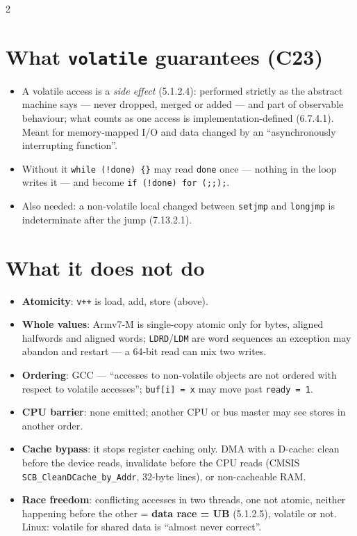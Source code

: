 \documentclass[8pt]{extarticle}
\newcommand\ct[1]{\texttt{#1}}
\begin{document}
\vspace{-3pt}
\begin{multicols}{2}
\raggedright
\footnotesize{}

\section{What \texttt{volatile} guarantees (C23)}
\begin{itemize}
  \item A volatile access is a \emph{side effect} (5.1.2.4): performed strictly as the abstract
        machine says — never dropped, merged or added — and part of observable behaviour; what
        counts as one access is implementation-defined (6.7.4.1). Meant for memory-mapped I/O
        and data changed by an ``asynchronously interrupting function''.
  \item Without it \ct{while (!done) \{\}} may read \ct{done} once — nothing in the loop
        writes it — and become \ct{if (!done) for (;;);}.
  \item Also needed: a non-volatile local changed between \ct{setjmp} and \ct{longjmp} is
        indeterminate after the jump (7.13.2.1).
\end{itemize}

\section{What it does not do}
\begin{itemize}
  \item \textbf{Atomicity}: \ct{v++} is load, add, store (above).
  \item \textbf{Whole values}: Armv7-M is single-copy atomic only for bytes, aligned halfwords
        and aligned words; \ct{LDRD}/\ct{LDM} are word sequences an exception may abandon and
        restart — a 64-bit read can mix two writes.
  \item \textbf{Ordering}: GCC — ``accesses to non-volatile objects are not ordered with respect
        to volatile accesses''; \ct{buf[i] = x} may move past \ct{ready = 1}.
  \item \textbf{CPU barrier}: none emitted; another CPU or bus master may see stores in
        another order.
  \item \textbf{Cache bypass}: it stops register caching only. DMA with a D-cache: clean before
        the device reads, invalidate before the CPU reads (CMSIS
        \ct{SCB\_CleanDCache\_by\_Addr}, 32-byte lines), or non-cacheable RAM.
  \item \textbf{Race freedom}: conflicting accesses in two threads, one not atomic, neither
        happening before the other = \textbf{data race = UB} (5.1.2.5), volatile or not. Linux:
        volatile for shared data is ``almost never correct''.
\end{itemize}


\end{multicols}
\end{document}
